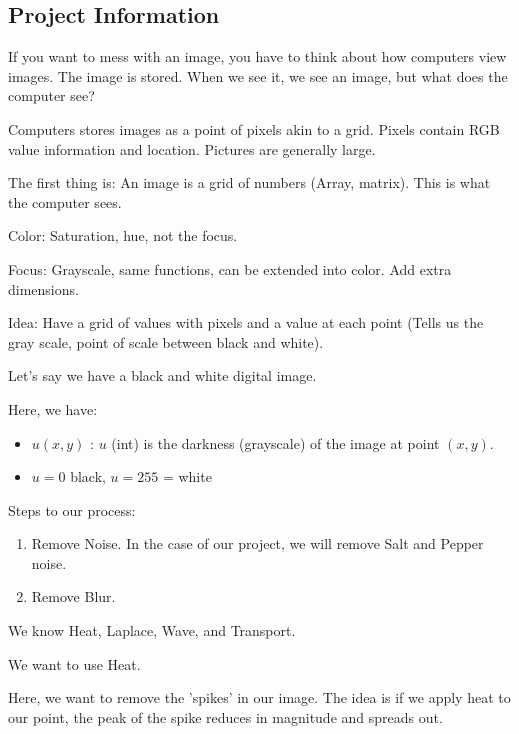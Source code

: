 \subsection*{Project Information}

If you want to mess with an image, you have to think about how computers view images. The image is stored. When we see it, we see an image, but what does the computer see?

Computers stores images as a point of pixels akin to a grid. Pixels contain RGB value information and location. Pictures are generally large.

The first thing is: An image is a grid of numbers (Array, matrix). This is what the computer sees.

Color: Saturation, hue, not the focus.

Focus: Grayscale, same functions, can be extended into color. Add extra dimensions.

Idea: Have a grid of values with pixels and a value at each point (Tells us the gray scale, point of scale between black and white).

\bigbreak


Let's say we have a black and white digital image.


Here, we have:

\begin{itemize}
  \item $u(x, y)$ : $u$ (int) is the darkness (grayscale) of the image at point $(x, y)$.
  \item $u = 0$ black, $u = 255$ = white
\end{itemize}

Steps to our process:
%
\begin{enumerate}
  \item Remove Noise. In the case of our project, we will remove Salt and Pepper noise.
  \item Remove Blur.
\end{enumerate}

We know Heat, Laplace, Wave, and Transport.

We want to use Heat.


Here, we want to remove the 'spikes' in our image. The idea is if we apply heat to our point, the peak of the spike reduces in magnitude and spreads out.

